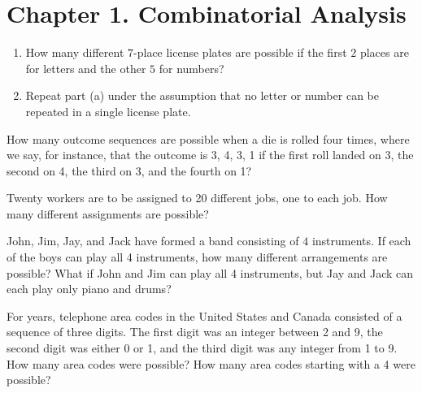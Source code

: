 \documentclass[12pt]{article}
\newenvironment{problem}[2][Problem]{\begin{trivlist}
\item[\hskip \labelsep {\bfseries #1}\hskip \labelsep {\bfseries #2.}]}{\end{trivlist}}
\begin{document}

\rhead{\today}



\section*{Chapter 1. Combinatorial Analysis}

\begin{problem}{1.1}
\begin{enumerate}[label=(\alph*)]
	\item How many different $7$-place license plates are possible if the first $2$ places are for letters and the other $5$ for numbers?
	\item Repeat part (a) under the assumption that no letter or number can be repeated in a single license plate.
\end{enumerate}
\end{problem}



\begin{problem}{1.2}
How many outcome sequences are possible when a die is rolled four times, where we say, for instance, that the outcome is 3, 4, 3, 1 if the first roll landed on 3, the second on 4, the third on 3, and the fourth on 1?
\end{problem}


\begin{problem}{1.3}
Twenty workers are to be assigned to 20 different jobs, one to each job. How many different assignments are possible?
\end{problem}


\begin{problem}{1.4}
John, Jim, Jay, and Jack have formed a band consisting of $4$ instruments. If each of the boys can play all 4 instruments, how many different arrangements are possible? What if John and Jim can play all 4 instruments, but Jay and Jack can each play only piano and drums?
\end{problem}


\begin{problem}{1.5}
For years, telephone area codes in the United States and Canada consisted of a sequence of three digits. The first digit was an integer between 2 and 9, the second digit was either 0 or 1, and the third digit was any integer from 1 to 9. How many area codes were possible? How many area codes starting with a 4 were possible?
\end{problem}
\end{document}
